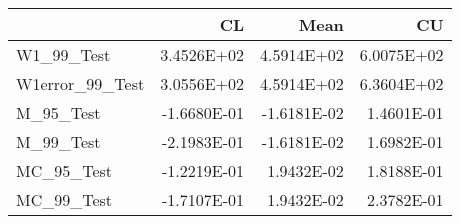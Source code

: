 \begin{tabular}{lrrr}
\toprule
{} &          CL &        Mean &         CU \\
\midrule
W1\_99\_Test      &  3.4526E+02 &  4.5914E+02 & 6.0075E+02 \\
W1error\_99\_Test &  3.0556E+02 &  4.5914E+02 & 6.3604E+02 \\
M\_95\_Test       & -1.6680E-01 & -1.6181E-02 & 1.4601E-01 \\
M\_99\_Test       & -2.1983E-01 & -1.6181E-02 & 1.6982E-01 \\
MC\_95\_Test      & -1.2219E-01 &  1.9432E-02 & 1.8188E-01 \\
MC\_99\_Test      & -1.7107E-01 &  1.9432E-02 & 2.3782E-01 \\
\bottomrule
\end{tabular}
